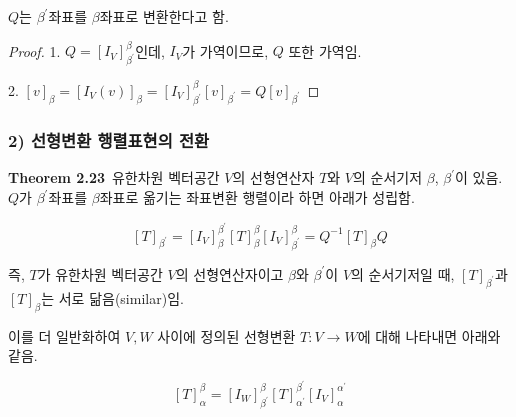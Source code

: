 $Q$는 $\beta^{\prime}$좌표를 $\beta$좌표로 변환한다고 함.

\begin{proof}
1. $Q=[I_V]^{\beta}_{\beta^{\prime}}$인데, $I_V$가 가역이므로, $Q$ 또한 가역임.

2. $[v]_{\beta}=[I_V(v)]_{\beta}=[I_V]_{\beta^{\prime}}^{\beta}[v]_{\beta^{\prime}}=Q[v]_{\beta^{\prime}}$
\end{proof}

\subsubsection*{2) 선형변환 행렬표현의 전환}
\textbf{Theorem 2.23}\, 유한차원 벡터공간 $V$의 선형연산자 $T$와 $V$의 순서기저 $\beta$, $\beta^{\prime}$이 있음. $Q$가 $\beta^{\prime}$좌표를 $\beta$좌표로 옮기는 좌표변환 행렬이라 하면 아래가 성립함.

\[
[T]_{\beta^{\prime}}=[I_V]_{\beta}^{\beta^\prime}[T]^{\beta}_{\beta}[I_V]_{\beta^{\prime}}^{\beta}=Q^{-1}[T]_{\beta}Q
\]

즉, $T$가 유한차원 벡터공간 $V$의 선형연산자이고 $\beta$와 $\beta^{\prime}$이 $V$의 순서기저일 때, $[T]_{\beta^{\prime}}$과 $[T]_{\beta}$는 서로 닮음(similar)임.

이를 더 일반화하여 $V,W$ 사이에 정의된 선형변환 $T:V \rightarrow W$에 대해 나타내면 아래와 같음.

\[
[T]_{\alpha}^{\beta}=[I_W]_{\beta^\prime}^{\beta}[T]_{\alpha^{\prime}}^{\beta^{\prime}}[I_V]_{\alpha}^{\alpha^{\prime}}
\]

